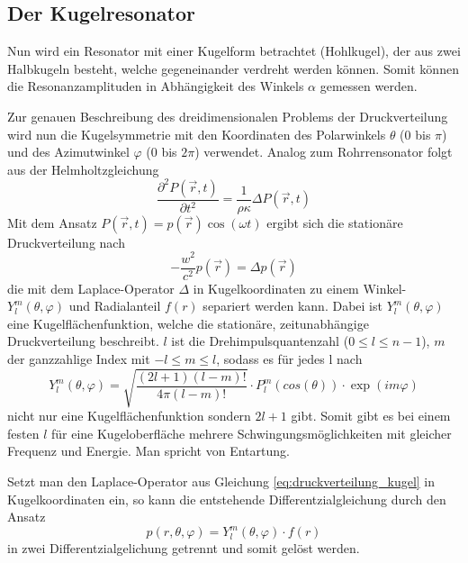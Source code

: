\subsection{Der Kugelresonator}
Nun wird ein Resonator mit einer Kugelform betrachtet (Hohlkugel), der aus zwei Halbkugeln besteht, welche gegeneinander verdreht werden können.
Somit können die Resonanzamplituden in Abhängigkeit des Winkels $\alpha$ gemessen werden.

Zur genauen Beschreibung des dreidimensionalen Problems der Druckverteilung wird nun die Kugelsymmetrie mit den Koordinaten des Polarwinkels $\theta$ (0 bis $\pi$)
und des Azimutwinkel $\varphi$ (0 bis $2\pi$) verwendet.
Analog zum Rohrrensonator folgt aus der Helmholtzgleichung
\begin{equation}
    \frac{\partial^2 P(\vec{r}{,}t)}{\partial t^2}=\frac{1}{\rho\kappa}\Delta P(\vec{r}{,}t)
\end{equation}
Mit dem Ansatz $P(\vec{r}{,}t)=p(\vec{r})\cos{(\omega t)}$ ergibt sich die stationäre 
Druckverteilung nach
\begin{equation}
    -\frac{w^2}{c^2}p(\vec{r})=\Delta p(\vec{r})
    \label{eq:druckverteilung_kugel}
\end{equation}
die mit dem Laplace-Operator $\Delta$ in Kugelkoordinaten zu einem Winkel- $Y_l^m(\theta{,}\varphi)$ und 
Radialanteil $f(r)$ separiert werden kann. Dabei ist $Y_l^m(\theta{,}\varphi)$ eine Kugelflächenfunktion, welche die 
stationäre, zeitunabhängige Druckverteilung beschreibt. $l$ ist die Drehimpulsquantenzahl ($0\leq l \leq n-1$),
$m$ der ganzzahlige Index mit $-l \leq m \leq l$, sodass es für jedes l nach
\begin{equation}
    Y^m_l(\theta{,}\varphi)=\sqrt{\frac{(2l+1)(l-m)!}{4\pi(l-m)!}}\cdot P_l^m(cos(\theta)) \cdot \exp({im\varphi})
\end{equation}
nicht nur eine Kugelflächenfunktion sondern $2l+1$ gibt. Somit gibt es bei einem festen $l$ für eine Kugeloberfläche
mehrere Schwingungsmöglichkeiten mit gleicher Frequenz und Energie. Man spricht von Entartung.

Setzt man den Laplace-Operator aus Gleichung \ref{eq:druckverteilung_kugel} in Kugelkoordinaten ein,
so kann die entstehende Differentzialgleichung durch den Ansatz
\begin{equation}
    p(r{,}\theta{,}\varphi)=Y_l^m(\theta{,}\varphi)\cdot f(r)
\end{equation}
in zwei Differentzialgelichung getrennt und somit gelöst werden.

